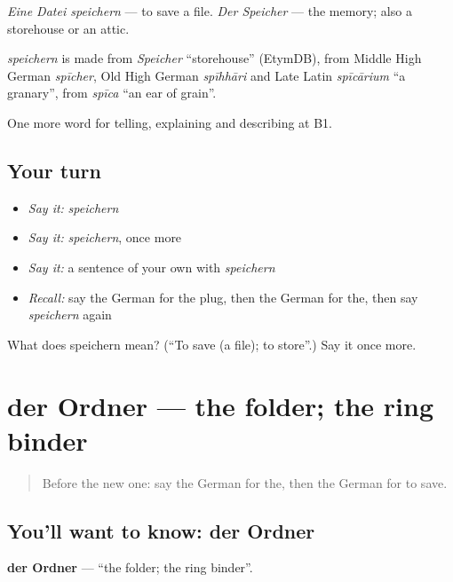 \emph{Eine Datei speichern} — to save a file. \emph{Der Speicher} — the memory; also a storehouse or an attic.

\begin{cousinweb}
\emph{speichern} is made from \emph{Speicher} \textquotedblleft{}storehouse\textquotedblright{} (EtymDB), from Middle High German \emph{spīcher}, Old High German \emph{spīhhāri} and Late Latin \emph{spīcārium} \textquotedblleft{}a granary\textquotedblright{}, from \emph{spīca} \textquotedblleft{}an ear of grain\textquotedblright{}.
\end{cousinweb}

\begin{grammarlens}[title={What you've built}]
One more word for telling, explaining and describing at B1.
\end{grammarlens}

\subsection*{Your turn}
\begin{itemize}
\raggedright
  \item \emph{Say it:} \emph{speichern}
  \item \emph{Say it:} \emph{speichern}, once more
  \item \emph{Say it:} a sentence of your own with \emph{speichern}
  \item \emph{Recall:} say the German for the plug, then the German for the, then say \emph{speichern} again
\end{itemize}

\begin{tcolorbox}[breakable,colback=teal!4,colframe=teal!35!black,title={Before you move on}]
What does speichern mean? (\textquotedblleft{}To save (a file); to store\textquotedblright{}.) Say it once more.
\end{tcolorbox}
\section[der Ordner]{der Ordner — the folder; the ring binder}

\label{lesson:GE-C393-ordner}



\begin{quote}
Before the new one: say the German for the, then the German for to save.
\end{quote}

\subsection*{You'll want to know: der Ordner}
\textbf{der Ordner} — \textquotedblleft{}the folder; the ring binder\textquotedblright{}.

